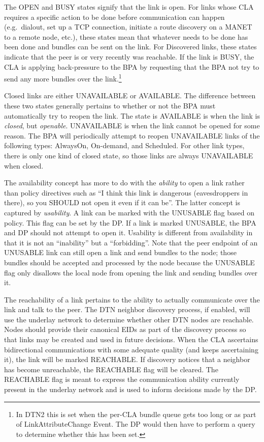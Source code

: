 \documentclass[11pt]{article}
\begin{document}
The OPEN and BUSY  states signify that the
link is open.  For links whose CLA requires a specific action to be done before
communication can happen (e.g.\ dialout, set up a TCP connection, initiate a
route discovery on a MANET to a remote node, etc.), these states mean that
whatever needs to be done has been done and bundles can be sent on the link.
For Discovered links, these states indicate that the peer is or very recently
was reachable.  If the link is BUSY, the CLA is applying back-pressure to the
BPA by requesting that the BPA not try to send any more bundles over the
link.\footnote{In DTN2 this is set when the per-CLA bundle queue gets too long
or as part of LinkAttributeChange Event. The DP would then have to perform a
query to determine whether this has been set.}

Closed links are either UNAVAILABLE or AVAILABLE. The difference between these
two states generally pertains to whether or not the BPA must automatically try
to reopen the link. The state is AVAILABLE is when the link is {\it closed},
but {\it openable}.  UNAVAILABLE is when the link cannot be opened for some
reason. The BPA will periodically attempt to reopen UNAVAILABLE links of the
following types: AlwaysOn, On-demand, and Scheduled. For other link types,
there is only one kind of closed state, so those links are always UNAVAILABLE
when closed.

The availability concept has more to do with the {\it ability} to open a link
rather than policy directives such as ``I think this link is dangerous
(eavesdroppers in there), so you SHOULD not open it even if it can be''. The
latter concept is captured by {\it usability}. A link can be marked with the
UNUSABLE flag based on policy. This flag can be set by the DP. If a link is
marked UNUSABLE, the BPA and DP should not attempt to open it. 
Usability is different from availability in that it is not an
``inability'' but a ``forbidding''. Note that the peer endpoint of an
UNUSABLE link can still open a link and send bundles to the node; those
bundles should be accepted and processed by the node because the UNUSABLE
flag only disallows the local node from opening the link and sending bundles
over it.

The reachability of a link pertains to the ability to actually communicate over
the link and talk to the peer. The DTN neighbor discovery process, if enabled,
will use the underlay network to determine whether other DTN nodes are
reachable. Nodes should provide their canonical EIDs as part of the discovery
process so that links may be created and used in future decisions.  When the
CLA ascertains bidirectional communications with some adequate quality (and
keeps ascertaining it), the link will be marked REACHABLE. If discovery notices
that a neighbor has become unreachable, the REACHABLE flag will be cleared.
The REACHABLE flag is meant to express the communication ability currently
present in the underlay network and is used to inform decisions made by the DP.
\end{document}
